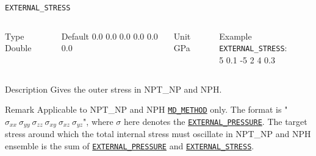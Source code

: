 \begin{frame}[allowframebreaks]{\texttt{EXTERNAL\_STRESS}} \label{EXTERNAL_STRESS}
\vspace*{-12pt}
\begin{columns}
\begin{block}{Type}
Double
\end{block}

\begin{block}{Default}
0.0 0.0 0.0 0.0 0.0 0.0
\end{block}

\begin{block}{Unit}
GPa
\end{block}

\begin{block}{Example}
\texttt{EXTERNAL\_STRESS}: \\ 5 0.1 -5 2 4 0.3
\end{block}
\end{columns}

\begin{block}{Description}
Gives the outer stress in NPT\_NP and NPH.
\end{block}

\begin{block}{Remark}
Applicable to NPT\_NP and NPH \hyperlink{MD_METHOD}{\texttt{MD\_METHOD}} only. The format is "$\sigma_{xx} \ \sigma_{yy} \ \sigma_{zz} \ \sigma_{xy} \ \sigma_{xz} \ \sigma_{yz}$", where $\sigma$ here denotes the \hyperlink{EXTERNAL\_PRESSURE}{\texttt{EXTERNAL\_PRESSURE}}. The target stress around which the total internal stress must oscillate in NPT\_NP and NPH ensemble is the sum of \hyperlink{EXTERNAL\_PRESSURE}{\texttt{EXTERNAL\_PRESSURE}} and \hyperlink{EXTERNAL\_STRESS}{\texttt{EXTERNAL\_STRESS}}.
\end{block}

\end{frame}



